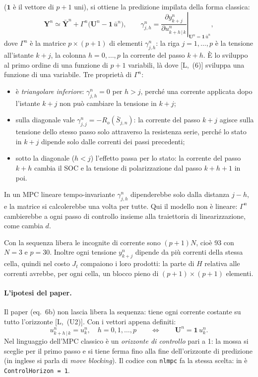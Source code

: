 \documentclass[11pt,a4paper]{article}
\newcommand{\file}[1]{\texttt{\detokenize{#1}}}
\newcommand{\uno}{\mathbf{1}}
\newcommand{\vett}[1]{\boldsymbol{#1}}      %
\begin{document}
($\uno$ è il vettore di $p+1$ uni), si ottiene la predizione impilata della
forma classica:
\begin{equation}
  \vett{Y}^n \simeq \bar{\vett{Y}}^n + \Gamma^n \bigl(\vett{U}^n - \uno\,\bar u^n\bigr) ,
  \qquad
  \gamma^n_{j,h} = \left.\frac{\partial y^n_{k+j}}{\partial u^n_{k+h\,|\,k}}
                   \right|_{\vett{U}^n = \uno\,\bar u^n} ,
  \tag{S1}\label{eq:s-impilata}
\end{equation}
dove $\Gamma^n$ è la matrice $p \times (p+1)$ di elementi $\gamma^n_{j,h}$: la
riga $j = 1, \dots, p$ è la tensione all'istante $k+j$, la colonna
$h = 0, \dots, p$ la corrente del passo $k+h$. È lo sviluppo al primo ordine di
una funzione di $p+1$ variabili, là dove [L,~(6)] sviluppa una funzione di una
variabile. Tre proprietà di $\Gamma^n$:
\begin{itemize}
  \item è \emph{triangolare inferiore}: $\gamma^n_{j,h} = 0$ per $h > j$,
        perché una corrente applicata dopo l'istante $k+j$ non può cambiare la
        tensione in $k+j$;
  \item sulla diagonale vale $\gamma^n_{j,j} = -R_o(\bar S_{j,n})$: la
        corrente del passo $k+j$ agisce sulla tensione dello stesso passo solo
        attraverso la resistenza serie, perché lo stato in $k+j$ dipende solo
        dalle correnti dei passi precedenti;
  \item sotto la diagonale ($h < j$) l'effetto passa per lo stato: la corrente
        del passo $k+h$ cambia il SOC e la tensione di polarizzazione dal passo
        $k+h+1$ in poi.
\end{itemize}
In un MPC lineare tempo-invariante $\gamma^n_{j,h}$ dipenderebbe solo dalla
distanza $j-h$, e la matrice si calcolerebbe una volta per tutte. Qui il
modello non è lineare: $\Gamma^n$ cambierebbe a ogni passo di controllo
insieme alla traiettoria di linearizzazione, come cambia $d$.

Con la sequenza libera le incognite di corrente sono $(p+1)N$, cioè 93 con
$N = 3$ e $p = 30$. Inoltre ogni tensione $y^n_{k+j}$ dipende da più correnti
della stessa cella, quindi nel costo $J_t$ compaiono i loro prodotti: la parte
di $H$ relativa alle correnti avrebbe, per ogni cella, un blocco pieno di
$(p+1) \times (p+1)$ elementi.

\paragraph{L'ipotesi del paper.} Il paper (eq.~6b) non lascia libera la
sequenza: tiene ogni corrente costante su tutto l'orizzonte [L,~(U2)]. Con i
vettori appena definiti:
\begin{equation}
  u^n_{k+h\,|\,k} = u^n_k , \quad h = 0, 1, \dots, p
  \qquad\Longleftrightarrow\qquad
  \vett{U}^n = \uno\, u^n_k .
  \tag{S2}\label{eq:s-costante}
\end{equation}
Nel linguaggio dell'MPC classico è un \emph{orizzonte di controllo} pari a 1:
la mossa si sceglie per il primo passo e si tiene ferma fino alla fine
dell'orizzonte di predizione (in inglese si parla di \emph{move blocking}). Il
codice con \texttt{nlmpc} fa la stessa scelta: in \file{crea_mpc.m} è
\texttt{ControlHorizon = 1}.
\end{document}
